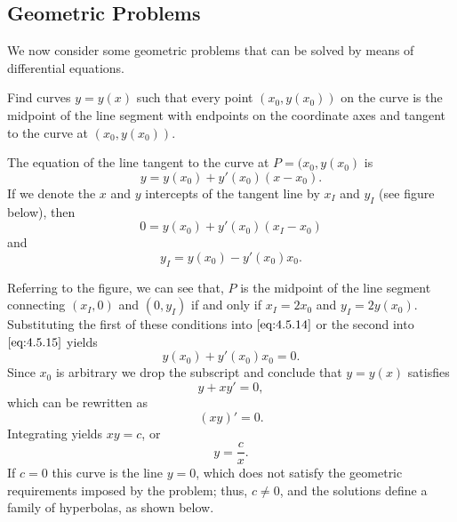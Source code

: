 \documentclass{ximera}
\begin{document}
 
\subsection*{Geometric Problems}
 
We now consider some geometric problems that can be solved by means of
differential equations.
 
\begin{example}\label{example:4.5.7}
Find curves $y=y(x)$ such that every point $(x_0,y(x_0))$ on the curve
is the midpoint of the line segment with endpoints on the coordinate
axes and tangent to the curve at $(x_0,y(x_0))$.
 
\begin{explanation}
 The equation of the  line tangent to the curve at $P=(x_0,y(x_0)$ is
$$
y=y(x_0)+y'(x_0)(x-x_0).
$$
If we denote the $x$ and $y$ intercepts of the tangent line by $x_I$
and $y_I$ (see figure below), then
\begin{equation} \label{eq:4.5.14}
0=y(x_0)+y'(x_0)(x_I-x_0)
\end{equation}
 and
\begin{equation} \label{eq:4.5.15}
y_I=y(x_0)-y'(x_0)x_0.
\end{equation}

\begin{center}
\end{center}

 
Referring to the figure, we can see that, $P$ is the midpoint of the line segment
connecting $(x_I,0)$ and $(0,y_I)$ if and only if $x_I=2x_0$ and
$y_I=2y(x_0)$. Substituting the first of these conditions into
$\eqref{eq:4.5.14}$ or the second into $\eqref{eq:4.5.15}$ yields
$$
y(x_0)+y'(x_0)x_0=0.
$$
Since $x_0$ is arbitrary we drop the subscript and conclude that
$y=y(x)$  satisfies
$$
y+xy'=0,
$$
which can be rewritten as
$$
(xy)'=0.
$$
Integrating  yields $xy=c$,  or
$$
y=\frac{c}{x}.
$$
If $c=0$ this curve is the line $y=0$, which does not satisfy the
geometric requirements imposed by the problem;   thus, $c\neq 0$, and the
solutions define a family of hyperbolas, as shown below.


\end{explanation}
\end{example}
\end{document}
